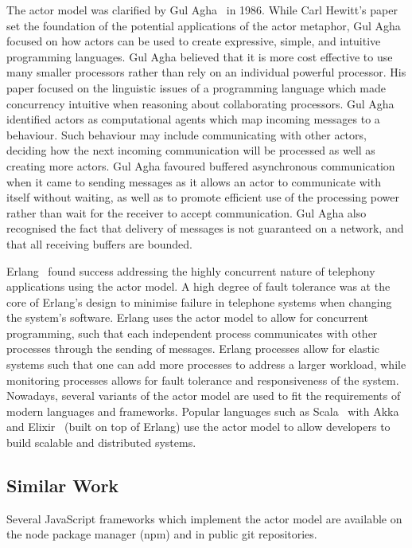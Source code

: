 \documentclass[lettersize,journal]{IEEEtran}
\begin{document}
The actor model was clarified by Gul Agha~\cite{agha1985actors} in 1986. While Carl Hewitt's paper set the foundation of the potential applications of the actor metaphor, Gul Agha focused on how actors can be used to create expressive, simple, and intuitive programming languages. Gul Agha believed that it is more cost effective to use many smaller processors rather than rely on an individual powerful processor. His paper focused on the linguistic issues of a programming language which made concurrency intuitive when reasoning about collaborating processors. Gul Agha identified actors as computational agents which map incoming messages to a behaviour. Such behaviour may include communicating with other actors, deciding how the next incoming communication will be processed as well as creating more actors. Gul Agha favoured buffered asynchronous communication when it came to sending messages as it allows an actor to communicate with itself without waiting, as well as to promote efficient use of the processing power rather than wait for the receiver to accept communication. Gul Agha also recognised the fact that delivery of messages is not guaranteed on a network, and that all receiving buffers are bounded.

Erlang~\cite{erlang} found success addressing the highly concurrent nature of telephony applications using the actor model. A high degree of fault tolerance was at the core of Erlang's design to minimise failure in telephone systems when changing the system's software. Erlang uses the actor model to allow for concurrent programming, such that each independent process communicates with other processes through the sending of messages. Erlang processes allow for elastic systems such that one can add more processes to address a larger workload, while monitoring processes allows for fault tolerance and responsiveness of the system. Nowadays, several variants of the actor model are used to fit the requirements of modern languages and frameworks. Popular languages such as Scala~\cite{scala} with Akka~\cite{akka} and Elixir~\cite{elixir} (built on top of Erlang) use the actor model to allow developers to build scalable and distributed systems.

\subsection{Similar Work}
Several JavaScript frameworks which implement the actor model are available on the node package manager (npm) and in public git repositories.
\end{document}

